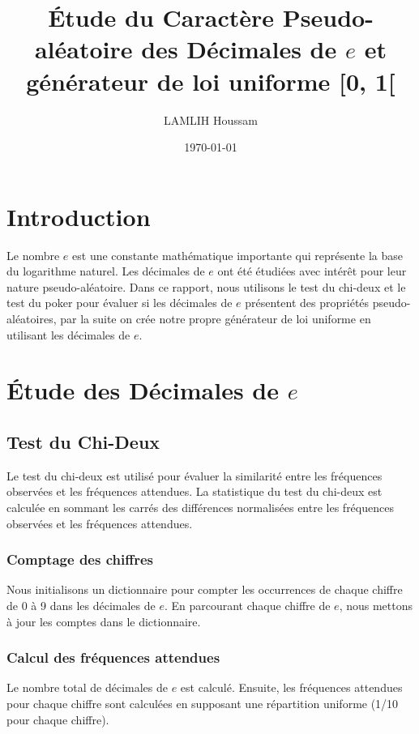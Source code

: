 \documentclass{article}
\begin{document}
\title{Étude du Caractère Pseudo-aléatoire des Décimales de \(e\) et générateur de loi uniforme [0, 1[}
\author{LAMLIH Houssam}
\date{\today}
\maketitle

\section{Introduction}

Le nombre \(e\) est une constante mathématique importante qui représente la base du logarithme naturel. Les décimales de \(e\) ont été étudiées avec intérêt pour leur nature pseudo-aléatoire. Dans ce rapport, nous utilisons le test du chi-deux et le test du poker pour évaluer si les décimales de \(e\) présentent des propriétés pseudo-aléatoires, par la suite on crée notre propre générateur de loi uniforme en utilisant les décimales de \(e\).

\section{Étude des Décimales de \(e\)}
\subsection{Test du Chi-Deux}

Le test du chi-deux est utilisé pour évaluer la similarité entre les fréquences observées et les fréquences attendues. La statistique du test du chi-deux est calculée en sommant les carrés des différences normalisées entre les fréquences observées et les fréquences attendues.

\subsubsection{Comptage des chiffres}

Nous initialisons un dictionnaire pour compter les occurrences de chaque chiffre de 0 à 9 dans les décimales de \(e\). En parcourant chaque chiffre de \(e\), nous mettons à jour les comptes dans le dictionnaire.

\subsubsection{Calcul des fréquences attendues}

Le nombre total de décimales de \(e\) est calculé. Ensuite, les fréquences attendues pour chaque chiffre sont calculées en supposant une répartition uniforme (1/10 pour chaque chiffre).
\end{document}
